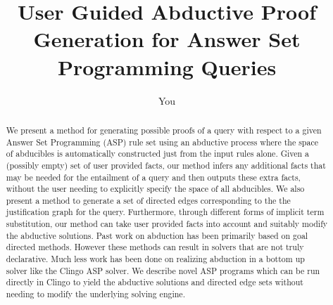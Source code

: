\documentclass{article}
\title{User Guided Abductive Proof Generation for Answer Set Programming Queries}
\author{You}
\begin{document}
\maketitle

\begin{abstract}
 We present a method for generating possible proofs of a query with respect to a given Answer Set Programming (ASP) rule set using an abductive process where the space of abducibles is automatically constructed just from the input rules alone. Given a (possibly empty) set of user provided facts, our method infers any additional facts that may be needed for the entailment of a query and then outputs these extra facts, without the user needing to explicitly specify the space of all abducibles. We also present a method to generate a set of directed edges corresponding to the the justification graph for the query. Furthermore, through different forms of implicit term substitution, our method can take user provided facts into account and suitably modify the abductive solutions. Past work on abduction has been primarily based on goal directed methods. However these methods can result in solvers that are not truly declarative. Much less work has been done on realizing abduction in a bottom up solver like the Clingo ASP solver. We describe novel ASP programs which can be run directly in Clingo to yield the abductive solutions and directed edge sets without needing to modify the underlying solving engine. 
\end{abstract}
\end{document}
